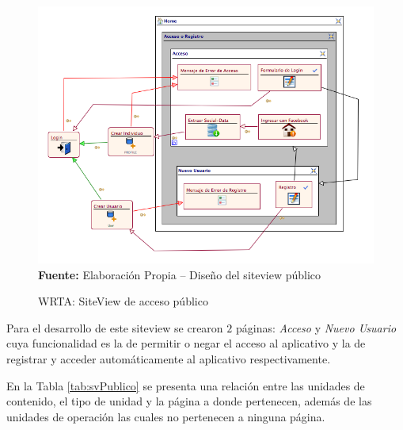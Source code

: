 \documentclass[oneside,12pt,a4paper]{memoir}%
\begin{document}
			\begin{figure}[here]
				\centering
				\caption{WRTA: SiteView de acceso p\'ublico}
				\includegraphics[width=1.0\textwidth]{figure/fig_WRTA_svPublico.png}
				\newline
				\textbf{Fuente:} Elaboraci\'on Propia -- Dise\~no del siteview p\'ublico
				\label{fig:WRTA_svPublico}
			\end{figure}	
			
			Para el desarrollo de este siteview se crearon $2$ p\'aginas: \textit{Acceso}
			y \textit{Nuevo Usuario} cuya funcionalidad es la de permitir o negar el
			acceso al aplicativo y la de registrar y acceder autom\'aticamente al
			aplicativo respectivamente.
			
			En la Tabla \ref{tab:svPublico} se presenta una relaci\'on entre las unidades
			de contenido, el tipo de unidad y la p\'agina a donde
			pertenecen, adem\'as de las unidades de operaci\'on las cuales no pertenecen
			a ninguna p\'agina.
					
\end{document}
